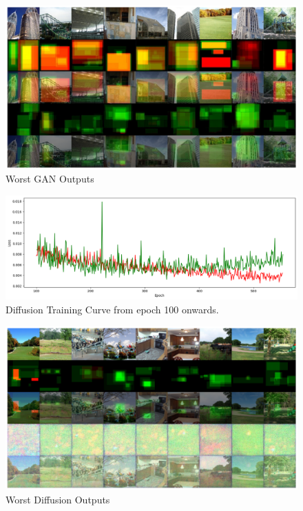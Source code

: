 \documentclass{UoYCSproject}
\begin{document}
\begin{figure}[ht]
    \centering
    \includegraphics[width=\linewidth]{Worst GAN Outputs}
    \caption{Worst GAN Outputs}
    \label{fig:GANWorstOutput}
\end{figure}

\begin{figure}[ht]
    \centering
    \includegraphics[width=\linewidth]{Diffusion training curve overfit}
    \caption{Diffusion Training Curve from epoch 100 onwards.}
    \label{fig:DiffusionTrainingOverfit}
\end{figure}

\begin{figure}[ht]
    \centering
    \includegraphics[width=\linewidth]{Worst Diffusion Outputs}
    \caption{Worst Diffusion Outputs}
    \label{fig:DiffusionWorstOutput}
\end{figure}

\printbibliography
\end{document}
